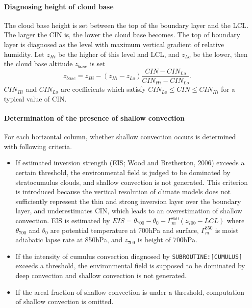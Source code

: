 \paragraph{Diagnosing height of cloud base}\label{diagno-height-of-cloud-base}

The cloud base height is set between the top of the boundary layer and the LCL. The larger the CIN is, the lower the cloud base becomes.
The top of boundary layer is diagnosed as the level with maximum vertical gradient of relative humidity.
Let $z_{Hi}$ be the higher of this level and LCL, and $z_{Lo}$ be the lower, then the cloud base altitude $z_{base}$ is set
\begin{equation}\label{zbase}
    z_{base} = z_{Hi} - (z_{Hi}-z_{Lo})\frac{CIN-CIN_{Lo}}{CIN_{Hi} - CIN_{Lo}}.
\end{equation}
$CIN_{Hi}$ and $CIN_{Lo}$ are coefficients which satisfy $CIN_{Lo}\le CIN \le CIN_{Hi}$ for a typical value of CIN.

\paragraph{Determination of the presence of shallow convection}\label{presence-of-shallow-convection}

For each horizontal column, whether shallow convection occurs is determined with following criteria.
\begin{itemize}
    \item If estimated inversion strength (EIS; Wood and Bretherton, 2006) exceeds a certain threshold,
    the environmental field is judged to be dominated by stratocumulus clouds, and shallow convection is not generated.
    This criterion is introduced because the vertical resolution of climate models does not sufficiently represent the thin and strong inversion layer over the boundary layer,
    and underestimates CIN, which leads to an overestimation of shallow convection.
    EIS is estimated by
     $EIS=\theta_{700}-\theta_{0}-\Gamma_m^{850}(z_{700}-LCL)$
    where $\theta_{700}$ and $\theta_0$ are potential temperature at 700hPa and surface, $\Gamma_m^{850}$ is moist adiabatic lapse rate at 850hPa,
    and $z_{700}$ is height of 700hPa.
    \item If the intensity of cumulus convection diagnosed by \texttt{SUBROUTINE:[CUMULUS]} exceeds a threshold, the environmental
    field is supposed to be dominated by deep convection and shallow convection is not generated.
    \item If the areal fraction of shallow convection is under a threshold, computation of shallow convection is omitted.
 \end{itemize}

